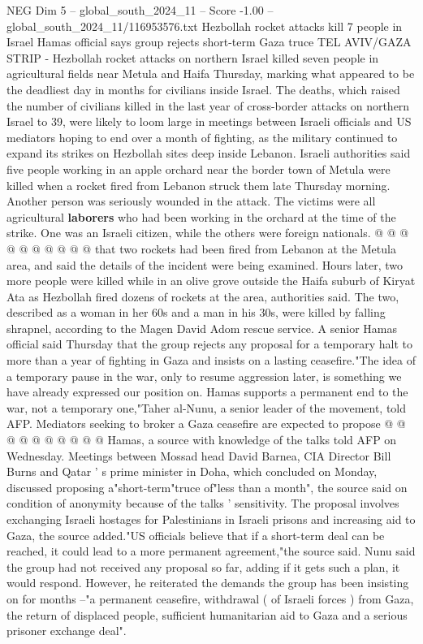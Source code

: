 \begin{textsample}{NEG Dim 5 – global\_south\_2024\_11 – Score -1.00 – global\_south\_2024\_11/116953576.txt}  \label{ex:f5_neg_421}
Hezbollah rocket attacks kill 7 people in Israel Hamas official says group rejects short-term Gaza truce TEL AVIV/GAZA STRIP - Hezbollah rocket attacks on northern Israel killed seven people in agricultural fields near Metula and Haifa Thursday, marking what appeared to be the deadliest day in months for civilians inside Israel.
The deaths, which raised the number of civilians killed in the last year of cross-border attacks on northern Israel to 39, were likely to loom large in meetings between Israeli officials and US mediators hoping to end over a month of fighting, as the military continued to expand its strikes on Hezbollah sites deep inside Lebanon.
Israeli authorities said five people working in an apple orchard near the border town of Metula were killed when a rocket fired from Lebanon struck them late Thursday morning.
Another person was seriously wounded in the attack.
The victims were all agricultural \textbf{laborers} who had been working in the orchard at the time of the strike.
One was an Israeli citizen, while the others were foreign nationals. @ @ @ @ @ @ @ @ @ @ that two rockets had been fired from Lebanon at the Metula area, and said the details of the incident were being examined.
Hours later, two more people were killed while in an olive grove outside the Haifa suburb of Kiryat Ata as Hezbollah fired dozens of rockets at the area, authorities said.
The two, described as a woman in her 60s and a man in his 30s, were killed by falling shrapnel, according to the Magen David Adom rescue service.
A senior Hamas official said Thursday that the group rejects any proposal for a temporary halt to more than a year of fighting in Gaza and insists on a lasting ceasefire."The idea of a temporary pause in the war, only to resume aggression later, is something we have already expressed our position on.
Hamas supports a permanent end to the war, not a temporary one,"Taher al-Nunu, a senior leader of the movement, told AFP.
Mediators seeking to broker a Gaza ceasefire are expected to propose @ @ @ @ @ @ @ @ @ @ Hamas, a source with knowledge of the talks told AFP on Wednesday.
Meetings between Mossad head David Barnea, CIA Director Bill Burns and Qatar ' s prime minister in Doha, which concluded on Monday, discussed proposing a"short-term"truce of"less than a month", the source said on condition of anonymity because of the talks ' sensitivity.
The proposal involves exchanging Israeli hostages for Palestinians in Israeli prisons and increasing aid to Gaza, the source added."US officials believe that if a short-term deal can be reached, it could lead to a more permanent agreement,"the source said.
Nunu said the group had not received any proposal so far, adding if it gets such a plan, it would respond.
However, he reiterated the demands the group has been insisting on for months --"a permanent ceasefire, withdrawal ( of Israeli forces ) from Gaza, the return of displaced people, sufficient humanitarian aid to Gaza and a serious prisoner exchange deal".

\end{textsample}
